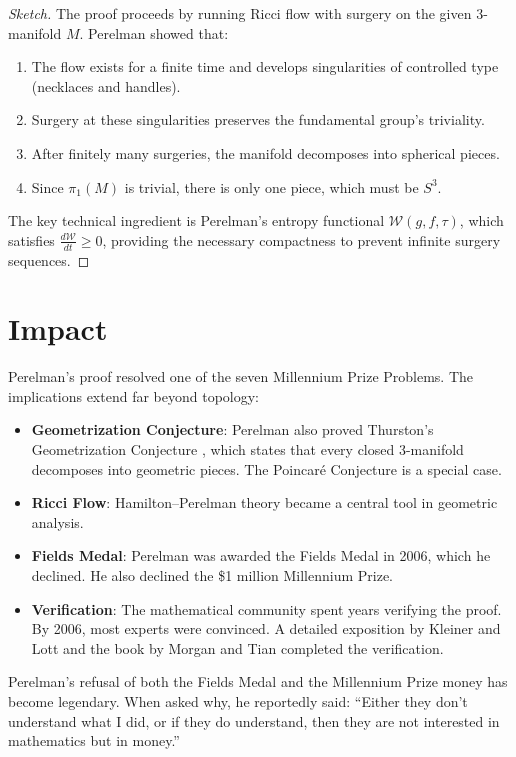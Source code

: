 \begin{proof}[Sketch]
The proof proceeds by running Ricci flow with surgery on the given 3-manifold $M$. Perelman showed that:
\begin{enumerate}
\item The flow exists for a finite time and develops singularities of controlled type (necklaces and handles).
\item Surgery at these singularities preserves the fundamental group's triviality.
\item After finitely many surgeries, the manifold decomposes into spherical pieces.
\item Since $\pi_1(M)$ is trivial, there is only one piece, which must be $S^3$.
\end{enumerate}
The key technical ingredient is Perelman's entropy functional $\mathcal{W}(g,f,\tau)$, which satisfies $\frac{d\mathcal{W}}{dt} \geq 0$, providing the necessary compactness to prevent infinite surgery sequences.
\end{proof}

\section{Impact}

Perelman's proof resolved one of the seven Millennium Prize Problems. The implications extend far beyond topology:

\begin{itemize}
\item \textbf{Geometrization Conjecture}: Perelman also proved Thurston's Geometrization Conjecture \cite{thurston1982}, which states that every closed 3-manifold decomposes into geometric pieces. The Poincar\'e Conjecture is a special case.
\item \textbf{Ricci Flow}: Hamilton--Perelman theory became a central tool in geometric analysis.
\item \textbf{Fields Medal}: Perelman was awarded the Fields Medal in 2006, which he declined. He also declined the \$1 million Millennium Prize.
\item \textbf{Verification}: The mathematical community spent years verifying the proof. By 2006, most experts were convinced. A detailed exposition by Kleiner and Lott \cite{kleiner2008} and the book by Morgan and Tian \cite{morgan2006} completed the verification.
\end{itemize}

\begin{historicalbox}
Perelman's refusal of both the Fields Medal and the Millennium Prize money has become legendary. When asked why, he reportedly said: ``Either they don't understand what I did, or if they do understand, then they are not interested in mathematics but in money.''
\end{historicalbox}


